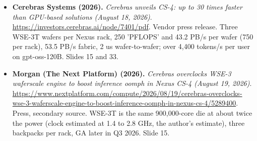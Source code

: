 \documentclass[11pt,letterpaper]{article}
\begin{document}
\begin{itemize}[leftmargin=1.2em,itemsep=3pt]
\item \textbf{Cerebras Systems (2026).} \textit{Cerebras unveils CS-4: up to 30 times faster than GPU-based solutions (August 18, 2026)}. \url{https://investors.cerebras.ai/node/7401/pdf}. Vendor press release. Three WSE-3T wafers per Nexus rack, 250 'PFLOPS' and 43.2 PB/s per wafer (750 per rack), 53.5 PB/s fabric, 2 us wafer-to-wafer; over 4,400 tokens/s per user on gpt-oss-120B. Slides 15 and 33.
\item \textbf{Morgan (The Next Platform) (2026).} \textit{Cerebras overclocks WSE-3 waferscale engine to boost inference oomph in Nexus CS-4 (August 19, 2026)}. \url{https://www.nextplatform.com/compute/2026/08/19/cerebras-overclocks-wse-3-waferscale-engine-to-boost-inference-oomph-in-nexus-cs-4/5289400}. Press, secondary source. WSE-3T is the same 900,000-core die at about twice the power (clock estimated at 1.4 to 2.8 GHz, the author's estimate), three backpacks per rack, GA later in Q3 2026. Slide 15.
\end{itemize}
\end{document}
